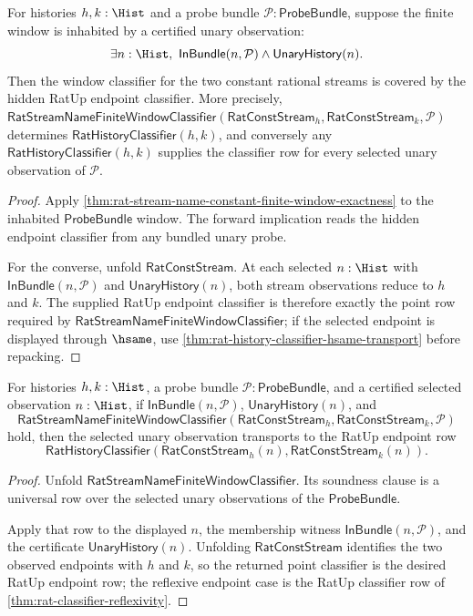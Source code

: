 \begin{theorem}
\label{thm:rat-const-stream-prefix-window-coverage}
For histories $h,k:\Hist$ and a probe bundle
$\mathcal{P}:\mathsf{ProbeBundle}$, suppose the finite window is inhabited by
a certified unary observation:
$$
\exists n:\Hist,\ \mathsf{InBundle}(n,\mathcal{P})\land
\mathsf{UnaryHistory}(n).
$$
Then the window classifier for the two constant rational streams is covered
by the hidden RatUp endpoint classifier. More precisely,
$\mathsf{RatStreamNameFiniteWindowClassifier}(\mathsf{RatConstStream}_h,
\mathsf{RatConstStream}_k,\mathcal{P})$ determines
$\mathsf{RatHistoryClassifier}(h,k)$, and conversely any
$\mathsf{RatHistoryClassifier}(h,k)$ supplies the classifier row for every
selected unary observation of $\mathcal{P}$.
\end{theorem}
\begin{proof}
Apply
\autoref{thm:rat-stream-name-constant-finite-window-exactness} to the
inhabited $\mathsf{ProbeBundle}$ window. The forward implication reads the
hidden endpoint classifier from any bundled unary probe.

For the converse, unfold $\mathsf{RatConstStream}$. At each selected
$n:\Hist$ with $\mathsf{InBundle}(n,\mathcal{P})$ and
$\mathsf{UnaryHistory}(n)$, both stream observations reduce to $h$ and $k$.
The supplied RatUp endpoint classifier is therefore exactly the point row
required by $\mathsf{RatStreamNameFiniteWindowClassifier}$; if the selected
endpoint is displayed through $\hsame$, use
\autoref{thm:rat-history-classifier-hsame-transport} before repacking.
\end{proof}

\begin{theorem}
\label{thm:rat-const-stream-prefix-window-soundness}
For histories $h,k:\Hist$, a probe bundle
$\mathcal{P}:\mathsf{ProbeBundle}$, and a certified selected observation
$n:\Hist$, if $\mathsf{InBundle}(n,\mathcal{P})$,
$\mathsf{UnaryHistory}(n)$, and
$$
\mathsf{RatStreamNameFiniteWindowClassifier}(\mathsf{RatConstStream}_h,
\mathsf{RatConstStream}_k,\mathcal{P})
$$
hold, then the selected unary observation transports to the RatUp endpoint
row
$$
\mathsf{RatHistoryClassifier}(\mathsf{RatConstStream}_h(n),
\mathsf{RatConstStream}_k(n)).
$$
\end{theorem}
\begin{proof}
Unfold $\mathsf{RatStreamNameFiniteWindowClassifier}$. Its soundness clause is
a universal row over the selected unary observations of the
$\mathsf{ProbeBundle}$.

Apply that row to the displayed $n$, the membership witness
$\mathsf{InBundle}(n,\mathcal{P})$, and the certificate
$\mathsf{UnaryHistory}(n)$. Unfolding $\mathsf{RatConstStream}$ identifies
the two observed endpoints with $h$ and $k$, so the returned point classifier
is the desired RatUp endpoint row; the reflexive endpoint case is the RatUp
classifier row of \autoref{thm:rat-classifier-reflexivity}.
\end{proof}

